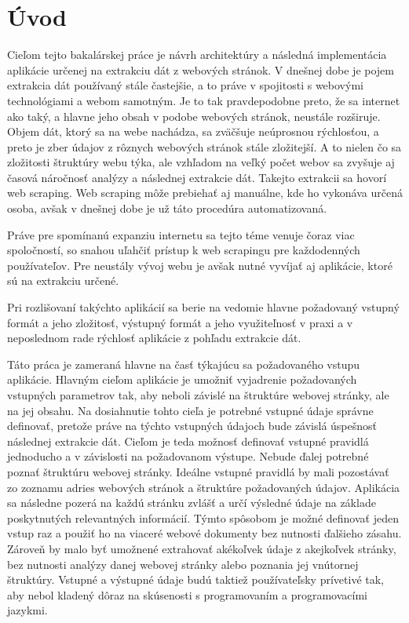 \chapter{Úvod}

Cieľom tejto bakalárskej práce je návrh architektúry a následná implementácia aplikácie určenej na extrakciu dát z webových stránok. V dnešnej dobe je pojem extrakcia dát používaný stále častejšie, a to práve v spojitosti s webovými technológiami a webom samotným. Je to tak pravdepodobne preto, že sa internet ako taký, a hlavne jeho obsah v podobe webových stránok, neustále rozširuje. Objem dát, ktorý sa na webe nachádza, sa zväčšuje neúprosnou rýchlosťou, a preto je zber údajov z rôznych webových stránok stále zložitejší. A to nielen čo sa zložitosti štruktúry webu týka, ale vzhľadom na veľký počet webov sa zvyšuje aj časová náročnosť analýzy a následnej extrakcie dát. Takejto extrakcii sa hovorí web scraping. Web scraping môže prebiehať aj manuálne, kde ho vykonáva určená osoba, avšak v dnešnej dobe je už táto procedúra automatizovaná.

Práve pre spomínanú expanziu internetu sa tejto téme venuje čoraz viac spoločností, so snahou uľahčiť prístup k web scrapingu pre každodenných používateľov. Pre neustály vývoj webu je avšak nutné vyvíjať aj aplikácie, ktoré sú na extrakciu určené. 

Pri rozlišovaní takýchto aplikácií sa berie na vedomie hlavne požadovaný vstupný formát a jeho zložitosť, výstupný formát a jeho využiteľnosť v praxi a v neposlednom rade rýchlosť aplikácie z pohľadu extrakcie dát. 

Táto práca je zameraná hlavne na časť týkajúcu sa požadovaného vstupu aplikácie. Hlavným cieľom aplikácie je umožniť vyjadrenie požadovaných vstupných parametrov tak, aby neboli závislé na štruktúre webovej stránky, ale na jej obsahu. Na dosiahnutie tohto cieľa je potrebné vstupné údaje správne definovať, pretože práve na týchto vstupných údajoch bude závislá úspešnosť následnej extrakcie dát. Cieľom je teda možnosť definovať vstupné pravidlá jednoducho a v závislosti na požadovanom výstupe. Nebude ďalej potrebné poznať štruktúru webovej stránky. Ideálne vstupné pravidlá by mali pozostávať zo zoznamu adries webových stránok a štruktúre požadovaných údajov. Aplikácia sa následne pozerá na každú stránku zvlášť a určí výsledné údaje na základe poskytnutých relevantných informácií. Týmto spôsobom je možné definovať jeden vstup raz a použiť ho na viaceré webové dokumenty bez nutnosti ďalšieho zásahu. Zároveň by malo byť umožnené extrahovať akékoľvek údaje z akejkoľvek stránky, bez nutnosti analýzy danej webovej stránky alebo poznania jej vnútornej štruktúry. Vstupné a výstupné údaje budú taktiež používateľsky prívetivé tak, aby nebol kladený dôraz na skúsenosti s programovaním a programovacími jazykmi.

